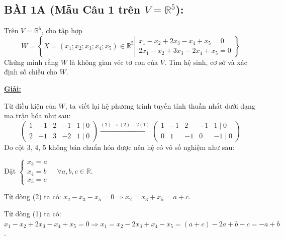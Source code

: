 \documentclass[12pt,a4paper]{article}
\newcommand{\R}{\mathbb{R}}
\begin{document}
\subsection*{BÀI 1A (Mẫu Câu 1 trên $V = \R^5$):}
Trên $V=\R^5$, cho tập hợp
\[
W = \left\{ X = (x_1; x_2; x_3; x_4; x_5) \in \R^5 \left| \begin{matrix} x_1 - x_2 + 2x_3 - x_4 + x_5 = 0 \\ 2x_1 - x_2 + 3x_3 - 2x_4 + x_5 = 0 \end{matrix} \right. \right\}
\]
Chứng minh rằng $W$ là không gian véc tơ con của $V$. Tìm hệ sinh, cơ sở và xác định số chiều cho $W$.

\underline{\textbf{Giải:}}

Từ điều kiện của $W$, ta viết lại hệ phương trình tuyến tính thuần nhất dưới dạng ma trận hóa như sau:
\[
\begin{pmatrix} 
1 & -1 & 2 & -1 & 1 \mid 0 \\ 
2 & -1 & 3 & -2 & 1 \mid 0 
\end{pmatrix}
\xrightarrow{(2) \to (2) - 2(1)}
\begin{pmatrix} 
1 & -1 & 2 & -1 & 1 \mid 0 \\ 
0 & 1 & -1 & 0 & -1 \mid 0 
\end{pmatrix}
\]
Do cột 3, 4, 5 không bán chuẩn hóa được nên hệ có vô số nghiệm như sau:

Đặt $\begin{cases} x_3 = a \\ x_4 = b \\ x_5 = c \end{cases} \quad \forall a, b, c \in \R$.

Từ dòng (2) ta có: $x_2 - x_3 - x_5 = 0 \Rightarrow x_2 = x_3 + x_5 = a + c$.

Từ dòng (1) ta có: $x_1 - x_2 + 2x_3 - x_4 + x_5 = 0 \Rightarrow x_1 = x_2 - 2x_3 + x_4 - x_5 = (a+c) - 2a + b - c = -a + b$.
\end{document}
